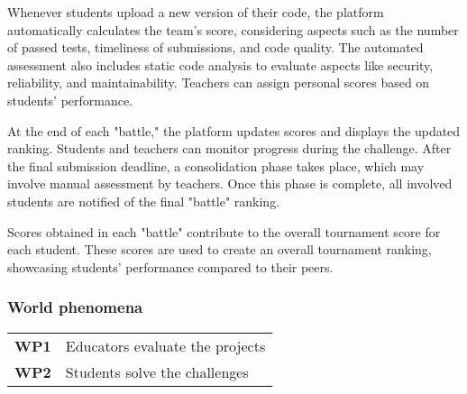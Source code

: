 \noindent Whenever students upload a new version of their code, the platform automatically calculates the team's score, considering aspects such as the number of passed tests, timeliness of submissions, and code quality. The automated assessment also includes static code analysis to evaluate aspects like security, reliability, and maintainability. Teachers can assign personal scores based on students' performance.

\noindent At the end of each "battle," the platform updates scores and displays the updated ranking. Students and teachers can monitor progress during the challenge. After the final submission deadline, a consolidation phase takes place, which may involve manual assessment by teachers. Once this phase is complete, all involved students are notified of the final "battle" ranking.

\noindent Scores obtained in each "battle" contribute to the overall tournament score for each student. These scores are used to create an overall tournament ranking, showcasing students' performance compared to their peers.

\subsubsection{World phenomena}
\begin{table}[H]
    \begin{tabularx}{\textwidth}{cX}
        \toprule
        \textbf{WP1} & Educators evaluate the projects        \\
        \textbf{WP2} & Students solve the challenges  
        \\ \bottomrule
    \end{tabularx}
\end{table}

